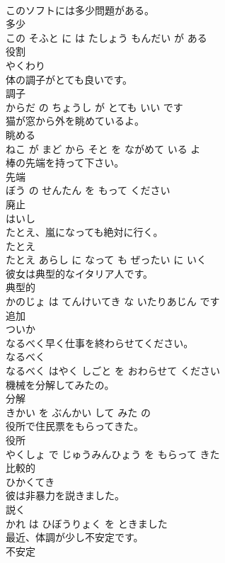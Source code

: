 \documentclass[8pt]{extreport}
\begin{document}
\begin{CJK}{UTF8}{min}
\\	このソフトには多少問題がある。	
\\	多少 
\\	この そふと に は たしょう もんだい が ある			
\\	役割	
\\	やくわり		
\\	体の調子がとても良いです。	
\\	調子 
\\	からだ の ちょうし が とても いい です			
\\	猫が窓から外を眺めているよ。	
\\	眺める 
\\	ねこ が まど から そと を ながめて いる よ			
\\	棒の先端を持って下さい。	
\\	先端 
\\	ぼう の せんたん を もって ください			
\\	廃止	
\\	はいし		
\\	たとえ、嵐になっても絶対に行く。	
\\	たとえ 
\\	たとえ あらし に なって も ぜったい に いく			
\\	彼女は典型的なイタリア人です。	
\\	典型的 
\\	かのじょ は てんけいてき な いたりあじん です			
\\	追加	
\\	ついか		
\\	なるべく早く仕事を終わらせてください。	
\\	なるべく 
\\	なるべく はやく しごと を おわらせて ください			
\\	機械を分解してみたの。	
\\	分解 
\\	きかい を ぶんかい して みた の			
\\	役所で住民票をもらってきた。	
\\	役所 
\\	やくしょ で じゅうみんひょう を もらって きた			
\\	比較的	
\\	ひかくてき		
\\	彼は非暴力を説きました。	
\\	説く 
\\	かれ は ひぼうりょく を ときました			
\\	最近、体調が少し不安定です。	
\\	不安定 

\end{CJK}
\end{document}
